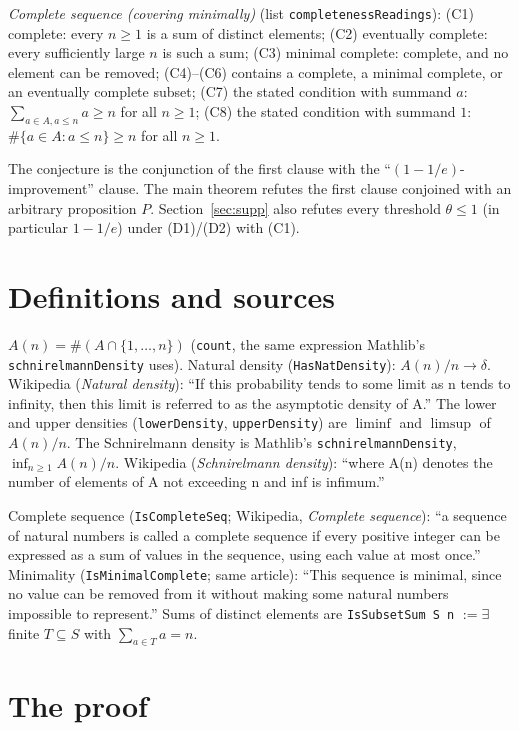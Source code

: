 \documentclass[11pt]{article}
\theoremstyle{definition}
\renewcommand{\_}{\oldus\allowbreak}
\begin{document}
\emph{Complete sequence (covering minimally)} (list \texttt{completenessReadings}):
(C1) complete: every $n\ge1$ is a sum of distinct elements; (C2) eventually complete: every sufficiently
large $n$ is such a sum; (C3) minimal complete: complete, and no element can be removed; (C4)--(C6)
contains a complete, a minimal complete, or an eventually complete subset; (C7) the stated condition with
summand $a$: $\sum_{a\in A,a\le n}a\ge n$ for all $n\ge1$; (C8) the stated condition with summand $1$:
$\#\{a\in A:a\le n\}\ge n$ for all $n\ge1$.

The conjecture is the conjunction of the first clause with the ``$(1-1/e)$-improvement'' clause. The main
theorem refutes the first clause conjoined with an arbitrary proposition $P$. Section~\ref{sec:supp} also
refutes every threshold $\theta\le1$ (in particular $1-1/e$) under (D1)/(D2) with (C1).

\section{Definitions and sources}

$A(n)=\#(A\cap\{1,\dots,n\})$ (\texttt{count}, the same expression Mathlib's \texttt{schnirelmannDensity}
uses). Natural density (\texttt{HasNatDensity}): $A(n)/n\to\delta$. Wikipedia (\emph{Natural density}):
``If this probability tends to some limit as n tends to infinity, then this limit is referred to as the
asymptotic density of A.'' The lower and upper densities (\texttt{lowerDensity}, \texttt{upperDensity})
are $\liminf$ and $\limsup$ of $A(n)/n$. The Schnirelmann density is Mathlib's
\texttt{schnirelmannDensity}, $\inf_{n\ge1}A(n)/n$. Wikipedia (\emph{Schnirelmann density}): ``where A(n)
denotes the number of elements of A not exceeding n and inf is infimum.''

Complete sequence (\texttt{IsCompleteSeq}; Wikipedia, \emph{Complete sequence}): ``a sequence of natural
numbers is called a complete sequence if every positive integer can be expressed as a sum of values in
the sequence, using each value at most once.'' Minimality (\texttt{IsMinimalComplete}; same article):
``This sequence is minimal, since no value can be removed from it without making some natural numbers
impossible to represent.'' Sums of distinct elements are \texttt{IsSubsetSum S n} $:=\exists$ finite
$T\subseteq S$ with $\sum_{a\in T}a=n$.

\section{The proof}
\end{document}
